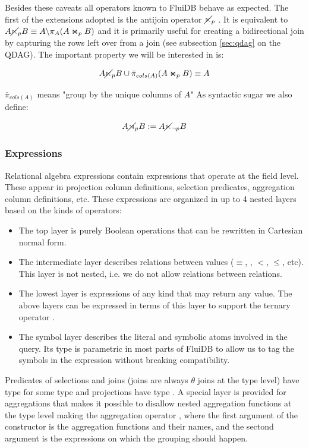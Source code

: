Besides these caveats all operators known to FluiDB behave as expected. 
The first of the extensions adopted is the antijoin operator
\(\cancel\ltimes_p\) . It is equivalent to
\(A \cancel\ltimes_p B \equiv A \backslash \pi_A(A \Join_p B)\) and it is
primarily useful for creating a bidirectional join by capturing the
rows left over from a join (see subsection \ref{sec:qdag} on the
QDAG). The important property we will be interested in is:

\[
  A \cancel\ltimes_p B \cup \bar\pi_{cols(A)}(A \Join_p B) \equiv A
\]

\(\bar{\pi}_{cols(A)}\) means "group by the unique columns of \(A\)"
As syntactic sugar we also define:

\[
  A \cancel\rtimes_p B := A \cancel\ltimes_{\neg p} B
\]

\subsubsection{Expressions}

Relational algebra expressions contain expressions that operate at the
field level. These appear in projection column definitions, selection
predicates, aggregation column definitions, etc. These expressions are
organized in up to 4 nested layers based on the kinds of operators:

\begin{itemize}
\item The top layer is purely Boolean operations  that 
  can be rewritten in Cartesian normal form.
\item The intermediate layer  describes relations between values
  (\(\equiv\), , \(<\), \(\le\), etc). This layer is not
  nested, i.e. we do not allow relations between relations.
\item The lowest layer  is expressions of any kind that may
  return any value. The above layers can be expressed in terms of this
  layer to support the ternary operator .
\item The symbol layer describes the literal and symbolic atoms involved in the query.
  Its type is parametric in most parts of FluiDB to allow 
  us to tag the symbols in the expression without breaking compatibility.
\end{itemize}

Predicates of selections and joins (joins are always \(\theta\) joins
at the type level) have type  for some type
 and projections have type . A
special layer is provided for aggregations  that makes it
possible to disallow nested aggregation functions at the type level
making the aggregation operator , where the first argument of the constructor is the
aggregation functions and their names, and the sectond argument is the
expressions on which the grouping should happen.

